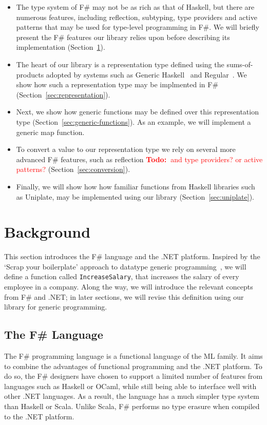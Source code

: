 \documentclass{sigplanconf}
\newcommand{\todo}[1]{
\ifthenelse
  {\boolean{showNotes}}
  {\textcolor{red}{\textbf{Todo:~}#1}}
  {}}
\begin{document}
\begin{itemize}
\item The type system of F\# may not be as rich as that of Haskell,
  but there are numerous features, including reflection, subtyping,
  type providers and active patterns that may be used for type-level
  programming in F\#. We will briefly present the F\# features our
  library relies upon before describing its implementation
  (Section~\ref{sec:background}).

\item The heart of our library is a representation type defined using
  the sums-of-products adopted by systems such as Generic
  Haskell~\cite{GenericHaskell} and Regular~\cite{Regular}. We show
  how such a representation type may be implmented in F\#
  (Section~\ref{sec:representation}).

\item Next, we show how generic functions may be defined over this
  representation type (Section~\ref{sec:generic-functions}). As an
  example, we will implement a generic map function.

\item To convert a value to our representation type we rely on several
  more advanced F\# features, such as reflection \todo{and type
    providers? or active patterns?} (Section~\ref{sec:conversion}).

\item Finally, we will show how how familiar functions from Haskell
  libraries such as Uniplate, may be implemented using our library
  (Section~\ref{sec:uniplate}).
\end{itemize}



\section{Background}
\label{sec:background}
This section introduces the F\# language and the .NET
platform. Inspired by the `Scrap your boilerplate' approach to
datatype generic programming~\cite{SYB}, we will define a
function called \verb+IncreaseSalary+, that increases the salary of
every employee in a company. Along the way, we will introduce the
relevant concepts from F\# and .NET; in later sections, we will revise
this definition using our library for generic programming.

\subsection{The F\# Language}
The F\# programming language is a functional language of the ML
family. It aims to combine the advantages of
functional programming and the .NET platform. To do so, the F\# designers
have chosen to support a limited number of features from languages such as Haskell or OCaml, 
while still being able to interface well with other .NET languages.
As a result, the language
has a much simpler type system than Haskell or Scala.
Unlike Scala, F\# performs no type erasure when compiled
to the .NET platform.
\end{document}
